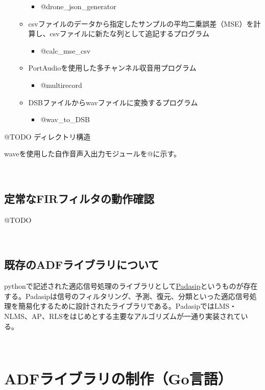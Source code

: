 \begin{itemize}
\begin{itemize}
    \begin{itemize}
    \tightlist
    \item
      @drone\_json\_generator
    \end{itemize}
  \item
    csvファイルのデータから指定したサンプルの平均二乗誤差（MSE）を計算し、csvファイルに新たな列として追記するプログラム

    \begin{itemize}
    \tightlist
    \item
      @calc\_mse\_csv
    \end{itemize}
  \item
    PortAudioを使用した多チャンネル収音用プログラム

    \begin{itemize}
    \tightlist
    \item
      @multirecord
    \end{itemize}
  \item
    DSBファイルからwavファイルに変換するプログラム

    \begin{itemize}
    \tightlist
    \item
      @wav\_to\_DSB
    \end{itemize}
  \end{itemize}
\end{itemize}

@TODO ディレクトリ構造

waveを使用した自作音声入出力モジュールを@に示す。

\
\subsection{定常なFIRフィルタの動作確認}\label{fir}

@TODO

\
\subsection{既存のADFライブラリについて}\label{ready‐made-adflib}

pythonで記述された適応信号処理のライブラリとして\href{https://matousc89.github.io/padasip/index.html\#padasip}{Padasip}というものが存在する。Padasipは信号のフィルタリング、予測、復元、分類といった適応信号処理を簡易化するために設計されたライブラリである。PadasipではLMS・NLMS、AP、RLSをはじめとする主要なアルゴリズムが一通り実装されている。

\
\section{ADFライブラリの制作（Go言語）}\label{create-adflib}

